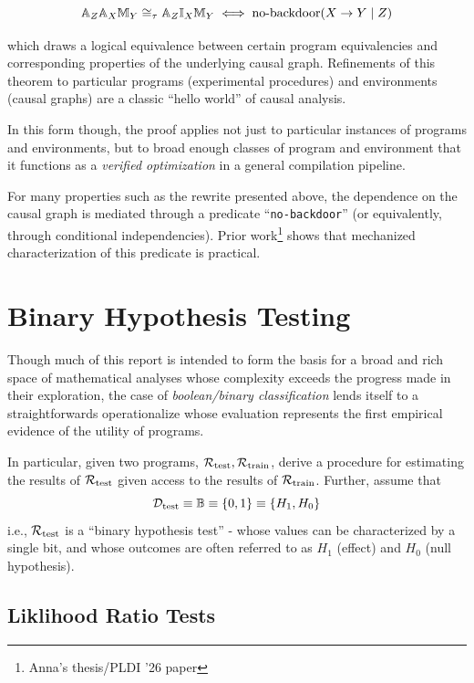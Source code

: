 \documentclass{article}
\begin{document}
\begin{equation*}
  \mathbb{A}_Z\mathbb{A}_X\mathbb{M}_Y \cong_\tau \mathbb{A}_Z\mathbb{I}_X\mathbb{M}_Y \iff \text{no-backdoor}(X \to Y \mid Z)
\end{equation*}

which draws a logical equivalence between certain program equivalencies and corresponding properties of the underlying causal graph. Refinements of this theorem to particular programs (experimental procedures) and environments (causal graphs) are a classic ``hello world'' of causal analysis.

In this form though, the proof applies not just to particular instances of programs and environments, but to broad enough classes of program and environment that it functions as a \textit{verified optimization} in a general compilation pipeline.

For many properties such as the rewrite presented above, the dependence on the causal graph is mediated through a predicate ``\texttt{no-backdoor}'' (or equivalently, through conditional independencies). Prior work\footnote{Anna's thesis/PLDI '26 paper} shows that mechanized characterization of this predicate is practical.

\section{Binary Hypothesis Testing}

Though much of this report is intended to form the basis for a broad and rich space of mathematical analyses whose complexity exceeds the progress made in their exploration, the case of \textit{boolean/binary classification} lends itself to a straightforwards operationalize whose evaluation represents the first empirical evidence of the utility of \AIM programs.

\newcommand{\Rtest}{\R_{\text{test}}}
\newcommand{\Rtrain}{\R_{\text{train}}}
\newcommand{\Dtest}{\D_{\text{test}}}
\newcommand{\Dtrain}{\D_{\text{train}}}


In particular, given two \AIM programs, $\Rtest, \Rtrain$, derive a procedure for estimating the results of $\Rtest$ given access to the results of $\Rtrain$. Further, assume that $$\Dtest \equiv \mathbb{B} \equiv\{0, 1\} \equiv \{H_1, H_0\}$$ i.e., $\Rtest$ is a ``binary hypothesis test'' - whose values can be characterized by a single bit, and whose outcomes are often referred to as $H_1$ (effect) and $H_0$ (null hypothesis).

\subsection{Liklihood Ratio Tests}
\end{document}
